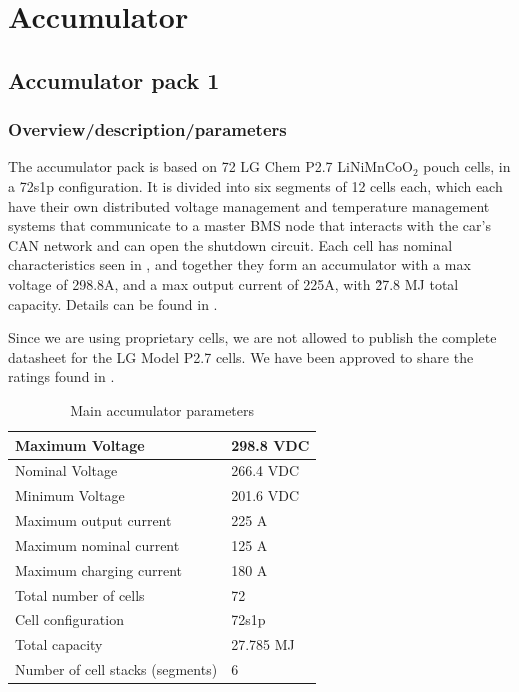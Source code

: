 \documentclass{article}
\begin{document}
\section{Accumulator}\label{accumulator}
\subsection{Accumulator pack 1}\label{accumulator_pack_1}
\subsubsection{Overview/description/parameters}\label{accumulator_overview}

The accumulator pack is based on 72 LG Chem P2.7 LiNiMnCoO$_{2}$ pouch cells, in a 72s1p configuration. It is divided into six segments of 12 cells each, which each have their own distributed voltage management and temperature management systems that communicate to a master BMS node that interacts with the car's CAN network and can open the shutdown circuit. Each cell has nominal characteristics seen in , and together they form an accumulator with a max voltage of 298.8A, and a max output current of 225A, with \~27.8 MJ total capacity. Details can be found in . 

Since we are using proprietary cells, we are not allowed to publish the complete datasheet for the LG Model P2.7 cells. We have been approved to share the ratings found in . 


	\begin{table}[H]
	    \centering
	    \begin{tabular}{|l|l|}
	        \hline
	        Maximum Voltage & 298.8 VDC \\ \hline
	        Nominal Voltage & 266.4 VDC \\ \hline
	        Minimum Voltage & 201.6 VDC \\ \hline
	        Maximum output current & 225 A \\ \hline
	        Maximum nominal current & 125 A \\ \hline
	        Maximum charging current & 180 A \\ \hline
	        Total number of cells & 72 \\ \hline
	        Cell configuration & 72s1p \\ \hline
	        Total capacity & 27.785 MJ \\ \hline
	        Number of cell stacks (segments) & 6 \\ \hline
	    \end{tabular}
	    \caption{Main accumulator parameters}
	    \label{tab:batterytable}
	\end{table}
\end{document}
